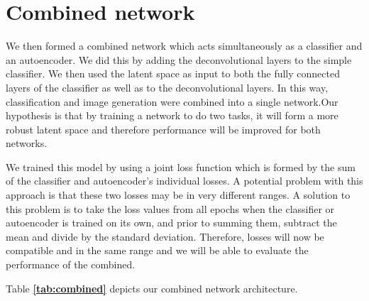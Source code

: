 \documentclass{l4proj}
\begin{document}
\section{Combined network}
We then formed a combined network which acts simultaneously as a classifier and an autoencoder. We did this by adding the deconvolutional layers to the simple classifier. We then used the latent space as input to both the fully connected layers of the classifier as well as to the deconvolutional layers. In this way, classification and image generation were combined into a single network.Our hypothesis is that by training a network to do two tasks, it will form a more robust latent space and therefore performance will be improved for both networks.

We trained this model by using a joint loss function which is formed by the sum of the classifier and autoencoder's individual losses. A potential problem with this approach is that these two losses may be in very different ranges. A solution to this problem is to take the loss values from all epochs when the classifier or autoencoder is trained on its own, and prior to summing them, subtract the mean and divide by the standard deviation. Therefore, losses will now be compatible and in the same range and we will be able to evaluate the performance of the combined.

Table \textbf{\ref{tab:combined}} depicts our combined network architecture.
\end{document}
